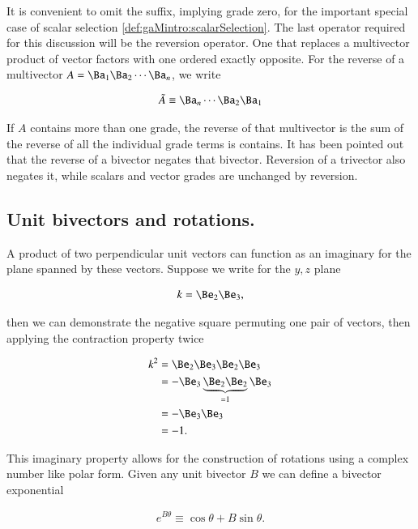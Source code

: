 It is convenient to omit the suffix, implying grade zero, for the important special case of scalar selection \ref{def:gaMintro:scalarSelection}.  The last operator required for this discussion will be the reversion operator.  One that replaces a multivector product of vector factors with one ordered exactly opposite.  For the reverse of a multivector $A = \Ba_1 \Ba_2 \cdots \Ba_n$, we write

\begin{definition}
\begin{align}\label{eqn:gaMintro:mp10}
\tilde{A} \equiv \Ba_n \cdots \Ba_2 \Ba_1
\end{align}
\end{definition}

If $A$ contains more than one grade, the reverse of that multivector is the sum of the reverse of all the individual grade terms is contains.  It has been pointed out that the reverse of a bivector negates that bivector.  Reversion of a trivector also negates it, while scalars and vector grades are unchanged by reversion.

\subsection{Unit bivectors and rotations.}

A product of two perpendicular unit vectors can function as an imaginary for the plane spanned by these vectors.  Suppose we write for the $y,z$ plane

\begin{align}\label{eqn:gaMintro:mp20}
k = \Be_2 \Be_3,
\end{align}

then we can demonstrate the negative square permuting one pair of vectors, then applying the contraction property twice

\begin{align*}
k^2 
&= \Be_2 \Be_3 \Be_2 \Be_3 \\
&= -\Be_3 \underbrace{\Be_2 \Be_2}_{=1} \Be_3 \\
&= -\Be_3 \Be_3 \\
&= -1.
\end{align*}

This imaginary property allows for the construction of rotations using a complex number like polar form.  Given any unit bivector $B$ we can define a bivector exponential

\begin{definition}
\begin{align}\label{eqn:gaMintro:mp30}
e^{B\theta} \equiv \cos\theta + B\sin\theta.
\end{align}
\end{definition}

